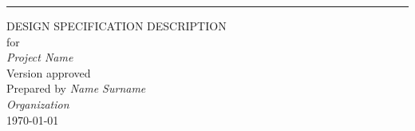 \begin{flushright}
    \rule{16cm}{5pt}\vskip1cm
    \begin{bfseries}
        \Huge{DESIGN SPECIFICATION DESCRIPTION}\\
        \vspace{1.9cm}
        for\\
        \vspace{1.9cm}
	    \textit{Project Name}\\
        \vspace{1.9cm}
        \LARGE{Version \myversion approved}\\
        \vspace{1.9cm}
        Prepared by \textit{Name Surname}\\
        \vspace{1.9cm}
        \textit{Organization}\\
        \vspace{1.9cm}
        \today\\
    \end{bfseries}
\end{flushright}